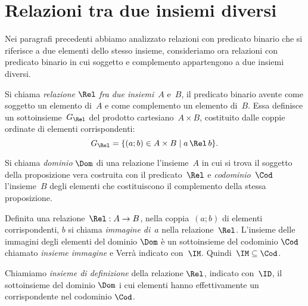 \ovalbox{\risolvii \ref{ese:\thechapter.38}, \ref{ese:\thechapter.39}, \ref{ese:\thechapter.40}, \ref{ese:\thechapter.41}, \ref{ese:\thechapter.42}, \ref{ese:\thechapter.43}}

\section{Relazioni tra due insiemi diversi}

Nei paragrafi precedenti abbiamo analizzato relazioni con predicato binario che si riferisce a due elementi dello stesso insieme, consideriamo ora relazioni con predicato binario in cui soggetto e complemento appartengono a due insiemi diversi.

\begin{definizione}
Si chiama \emph{relazione} $\Rel$ \emph{fra due insiemi}~$A$ e~$B$, il predicato binario avente come soggetto un elemento di~$A$ e come complemento un elemento di~$B$.
Essa definisce un sottoinsieme~$G_\Rel$ del prodotto cartesiano~$A \times B$, costituito dalle coppie ordinate di elementi corrispondenti:
\[ G_\Rel=\{(a;b)\in A \times B \mid  a \,\Rel\, b \}.\]
\end{definizione}

\begin{definizione}
Si chiama \emph{dominio} $\Dom$ di una relazione l'insieme~$A$ in cui si trova il soggetto della proposizione vera costruita con il predicato~$\Rel$ e \emph{codominio}~$\Cod$
l'insieme~$B$ degli elementi che costituiscono il complemento della stessa proposizione.
\end{definizione}

\begin{definizione}
Definita una relazione~$\Rel:A \rightarrow B$, nella coppia~$(a;b)$ di elementi corrispondenti, $b$ si chiama \emph{immagine di}~$a$ nella relazione~$\Rel$.
L'insieme delle immagini degli elementi del dominio $\Dom$ è un sottoinsieme del codominio $\Cod$ chiamato \emph{insieme immagine} e Verrà indicato con~$\IM$. Quindi~$\IM \subseteq\Cod$.
\end{definizione}

\begin{definizione}
Chiamiamo \emph{insieme di definizione} della relazione $\Rel$, indicato con~$\ID$, il sottoinsieme del dominio $\Dom$ i cui elementi hanno effettivamente un corrispondente nel codominio $\Cod$.
\end{definizione}

